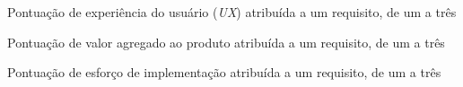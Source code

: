
\begin{simbolos}
  \item[$ \heartsuit $] Pontuação de experiência do usuário (\textit{UX}) atribuída a um requisito, de um a três
  \item[\$] Pontuação de valor agregado ao produto atribuída a um requisito, de um a três
  \item[\textit{E}] Pontuação de esforço de implementação atribuída a um requisito, de um a três
\end{simbolos}
